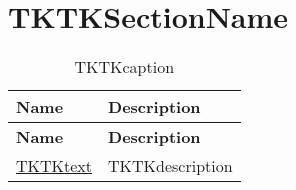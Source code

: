 
\clearpage
\section{TKTKSectionName}

\setlength\LTleft{0pt}
\setlength\LTright{0pt}
\begin{longtable}[c]{|p{}|p{}|}
  \hline
  \rowcolor{owasplightpurple}
  \textbf{Name} &
  \textbf{Description}\\
  \hline
  \endfirsthead
  \hline
  \rowcolor{owasplightpurple}
  \textbf{Name} &
  \textbf{Description} \\
  \hline
  \endhead
  \endfoot
  \href{TKTKlink}{TKTKtext} &
  TKTKdescription
  \hline
  \caption{TKTKcaption}
  \label{tab:TKTKlabel}
\end{longtable}
